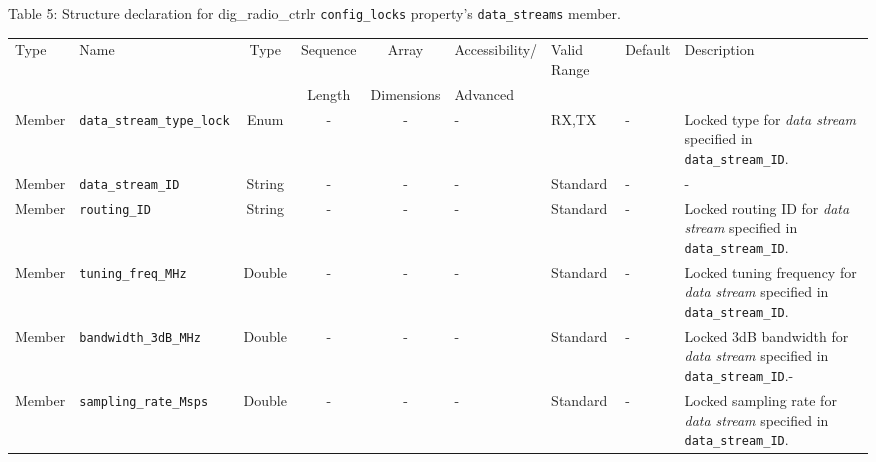 \documentclass{article}
\def\comp{dig\_radio\_ctrlr}
\begin{document}
\begin{landscape}
	\noindent Table \hypertarget{tab5}{5}: Structure declaration for \comp{} \verb+config_locks+ property's \verb+data_streams+ member. \\
	\begin{scriptsize}
		\noindent\begin{longtable}{|p{1.8cm}|p{3.6cm}|c|c|c|p{2cm}|p{1.7cm}|p{1.0cm}|p{7.38cm}|}
			\hline
			\rowcolor{blue}
			Type         & Name                                & Type & Sequence & Array      & Accessibility/ & Valid Range  & Default & Description                                                                                                                                                                                                                 \\
			\rowcolor{blue}
			             &                                     &      & Length   & Dimensions & Advanced       &              &         &                                                                                                                                                                                                                             \\
			\hline
			Member       & \verb+data_stream_type_lock+        & Enum  & -       & -          & -              & RX,TX        & -       & Locked type for \textit{data stream} specified in \verb+data_stream_ID+. \\
			\hline
			Member       & \verb+data_stream_ID+               & String& -       & -          & -              & Standard     & -       & - \\
			\hline
			Member       & \verb+routing_ID+                   & String& -       & -          & -              & Standard     & -       & Locked routing ID for \textit{data stream} specified in \verb+data_stream_ID+. \\
			\hline
			Member       & \verb+tuning_freq_MHz+              & Double & -       & -          & -              & Standard     & -       & Locked tuning frequency for \textit{data stream} specified in \verb+data_stream_ID+. \\
			\hline
			Member       & \verb+bandwidth_3dB_MHz+              & Double & -       & -          & -              & Standard     & -       & Locked 3dB bandwidth for \textit{data stream} specified in \verb+data_stream_ID+.- \\
			\hline
			Member       & \verb+sampling_rate_Msps+             & Double & -       & -          & -              & Standard     & -       & Locked sampling rate for \textit{data stream} specified in \verb+data_stream_ID+. \\

\end{longtable}
\end{scriptsize}
\end{landscape}
\end{document}
